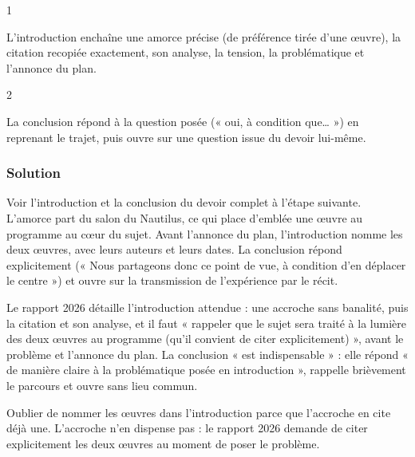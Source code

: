 \documentclass[11pt,a4paper]{article}
\begin{document}
\begin{indication}{1}

L'introduction enchaîne une amorce précise (de préférence tirée d'une œuvre), la citation recopiée exactement, son analyse, la tension, la problématique et l'annonce du plan.

\end{indication}

\begin{indication}{2}

La conclusion répond à la question posée (« oui, à condition que\ldots{} ») en reprenant le trajet, puis ouvre sur une question issue du devoir lui-même.

\end{indication}

\hypertarget{solution-6}{%
\subsubsection{Solution}\label{solution-6}}

Voir l'introduction et la conclusion du devoir complet à l'étape suivante. L'amorce part du salon du Nautilus, ce qui place d'emblée une œuvre au programme au cœur du sujet. Avant l'annonce du plan, l'introduction nomme les deux œuvres, avec leurs auteurs et leurs dates. La conclusion répond explicitement (« Nous partageons donc ce point de vue, à condition d'en déplacer le centre ») et ouvre sur la transmission de l'expérience par le récit.

\begin{jury}

Le rapport 2026 détaille l'introduction attendue : une accroche sans banalité, puis la citation et son analyse, et il faut « rappeler que le sujet sera traité à la lumière des deux œuvres au programme (qu'il convient de citer explicitement) », avant le problème et l'annonce du plan. La conclusion « est indispensable » : elle répond « de manière claire à la problématique posée en introduction », rappelle brièvement le parcours et ouvre sans lieu commun.

\end{jury}

\begin{piege}

Oublier de nommer les œuvres dans l'introduction parce que l'accroche en cite déjà une. L'accroche n'en dispense pas : le rapport 2026 demande de citer explicitement les deux œuvres au moment de poser le problème.

\end{piege}
\end{document}
